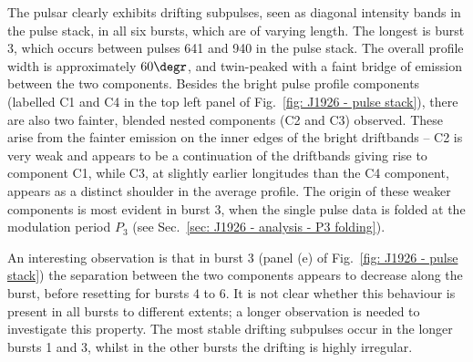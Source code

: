 The pulsar clearly exhibits drifting subpulses, seen as diagonal intensity bands in the pulse stack, in all six bursts, which are of varying length. The longest is burst 3, which occurs between pulses 641 and 940 in the pulse stack. The overall profile width is approximately $60\degr$, and twin-peaked with a faint bridge of emission between the two components. Besides the bright pulse profile components (labelled C1 and C4 in the top left panel of Fig.~\ref{fig: J1926 - pulse stack}), there are also two fainter, blended nested components (C2 and C3) observed. These arise from the fainter emission on the inner edges of the bright driftbands -- C2 is very weak and appears to be a continuation of the driftbands giving rise to component C1, while C3, at slightly earlier longitudes than the C4 component, appears as a distinct shoulder in the average profile. The origin of these weaker components is most evident in burst 3, when the single pulse data is folded at the modulation period $P_3$ (see Sec.~\ref{sec: J1926 - analysis - P3 folding}).

An interesting observation is that in burst 3 (panel (e) of Fig.~\ref{fig: J1926 - pulse stack}) the separation between the two components appears to decrease along the burst, before resetting for bursts 4 to 6. It is not clear whether this behaviour is present in all bursts to different extents; a longer observation is needed to investigate this property. The most stable drifting subpulses occur in the longer bursts 1 and 3, whilst in the other bursts the drifting is highly irregular.


